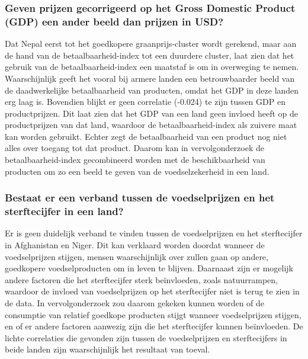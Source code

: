 \documentclass{article}
\begin{document}
\subsubsection*{Geven prijzen gecorrigeerd op het Gross Domestic Product (GDP) een ander beeld dan prijzen in USD?}
Dat Nepal eerst tot het goedkopere graanprijs-cluster wordt gerekend, maar aan de hand van de betaalbaarheid-index tot een duurdere cluster, laat zien dat het gebruik van de betaalbaarheid-index een maatstaf is om in overweging te nemen. Waarschijnlijk geeft het vooral bij armere landen een betrouwbaarder beeld van de daadwerkelijke betaalbaarheid van producten, omdat het GDP in deze landen erg laag is. Bovendien blijkt er geen correlatie (-0.024) te zijn tussen GDP en productprijzen. Dit laat zien dat het GDP van een land  geen invloed heeft op de productprijzen van dat land, waardoor de betaalbaarheid-index als zuivere maat kan worden gebruikt. 
Echter zegt de betaalbaarheid van een product nog niet alles over toegang tot dat product. Daarom kan in vervolgonderzoek de betaalbaarheid-index gecombineerd worden met de beschikbaarheid van producten om zo een beeld te geven van de voedselzekerheid in een land.


\subsubsection*{Bestaat er een verband tussen de voedselprijzen en het sterftecijfer in een land?}
Er is geen duidelijk verband te vinden tussen de voedselprijzen en het sterftecijfer in Afghanistan en Niger.
Dit kan verklaard worden doordat wanneer de voedselprijzen stijgen, mensen waarschijnlijk over zullen gaan op andere, goedkopere voedselproducten om in leven te blijven. Daarnaast zijn er mogelijk andere factoren die het sterftecijfer sterk beïnvloeden, zoals natuurrampen, waardoor de invloed van voedselprijzen op het sterftecijfer niet is terug te zien in de data. In vervolgonderzoek zou daarom gekeken kunnen worden of de consumptie van relatief goedkope producten stijgt wanneer voedselprijzen stijgen, en of er andere factoren aanwezig zijn die het sterftecijfer kunnen beïnvloeden. De lichte correlaties die gevonden zijn tussen de voedselprijzen en sterftecijfers in beide landen zijn waarschijnlijk het resultaat van toeval.
\end{document}
